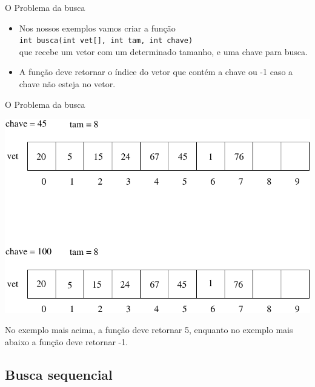 \documentclass[handout]{beamer}
\newcommand{\cod}[1]{\texttt{#1}}
\begin{document}
\begin{frame}[fragile]{O Problema da busca}

    \begin{itemize}
        \item Nos nossos exemplos vamos criar a função\\
        \cod{int busca(int vet[], int tam, int chave)}\\
        que recebe um vetor com um determinado tamanho, e uma chave para busca.
        \item A função deve retornar o índice do vetor que contém a chave ou -1 caso a chave não esteja no vetor.
    \end{itemize}

\end{frame}

\begin{frame}[fragile]{O Problema da busca}

    \begin{center}
        \includegraphics[scale=0.5]{busca}
    \end{center}

    No exemplo mais acima, a função deve retornar 5, enquanto no exemplo mais abaixo a função deve retornar -1.

\end{frame}

\subsection{Busca sequencial}
\end{document}
